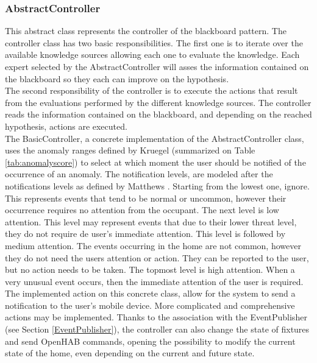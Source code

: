 \subsubsection{AbstractController}
\label{Controller}
This abstract class represents the controller of the blackboard pattern. The controller class has two basic responsibilities. The first one is to iterate over the available knowledge sources allowing each one to evaluate the knowledge. Each expert selected by the AbstractController will asses the information contained on the blackboard so they each can improve on the hypothesis.\\
The second responsibility of the controller is to execute the actions that result from the evaluations performed by the different knowledge sources. The controller reads the information contained on the blackboard, and depending on the reached hypothesis, actions are executed.\\
The BasicController, a concrete implementation of the AbstractController class, uses the anomaly ranges defined by Kruegel \etAl \cite{Kruegel:2003:BEC:956415.956436} (summarized on Table \ref{tab:anomalyscore}) to select at which moment the user should be notified of the occurrence of an anomaly. The notification levels, are modeled after the notifications levels as defined by Matthews \etAl \cite{Matthews:2004:TMU:1029632.1029676}.  Starting from the lowest one, ignore. This represents events that tend to be normal or uncommon, however their occurrence requires no attention from the occupant. The next level is low attention. This level may represent events that due to their lower threat level, they do not require de user's immediate attention. This level is followed by medium attention. The events occurring in the home are not common, however they do not need the users attention or action. They can be reported to the user, but no action needs to be taken. The topmost level is high attention. When a very unusual event occurs, then the immediate attention of the user is required. \\
The implemented action on this concrete class, allow for the system to send a notification to the user's mobile device. More complicated and comprehensive actions may be implemented. Thanks to the association with the EventPublisher (see Section \ref{EventPublisher}), the controller can also change the state of fixtures and send OpenHAB commands, opening the possibility to modify the current state of the home, even depending on the current and future state. %

